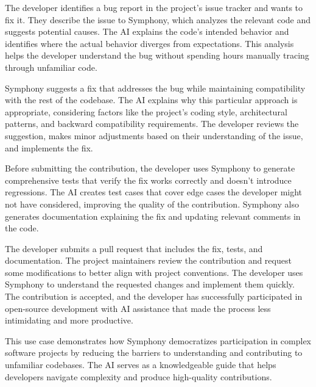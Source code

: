 The developer identifies a bug report in the project's issue tracker and wants to fix it. They describe the issue to Symphony, which analyzes the relevant code and suggests potential causes. The AI explains the code's intended behavior and identifies where the actual behavior diverges from expectations. This analysis helps the developer understand the bug without spending hours manually tracing through unfamiliar code.

Symphony suggests a fix that addresses the bug while maintaining compatibility with the rest of the codebase. The AI explains why this particular approach is appropriate, considering factors like the project's coding style, architectural patterns, and backward compatibility requirements. The developer reviews the suggestion, makes minor adjustments based on their understanding of the issue, and implements the fix.

Before submitting the contribution, the developer uses Symphony to generate comprehensive tests that verify the fix works correctly and doesn't introduce regressions. The AI creates test cases that cover edge cases the developer might not have considered, improving the quality of the contribution. Symphony also generates documentation explaining the fix and updating relevant comments in the code.

The developer submits a pull request that includes the fix, tests, and documentation. The project maintainers review the contribution and request some modifications to better align with project conventions. The developer uses Symphony to understand the requested changes and implement them quickly. The contribution is accepted, and the developer has successfully participated in open-source development with AI assistance that made the process less intimidating and more productive.

This use case demonstrates how Symphony democratizes participation in complex software projects by reducing the barriers to understanding and contributing to unfamiliar codebases. The AI serves as a knowledgeable guide that helps developers navigate complexity and produce high-quality contributions.
